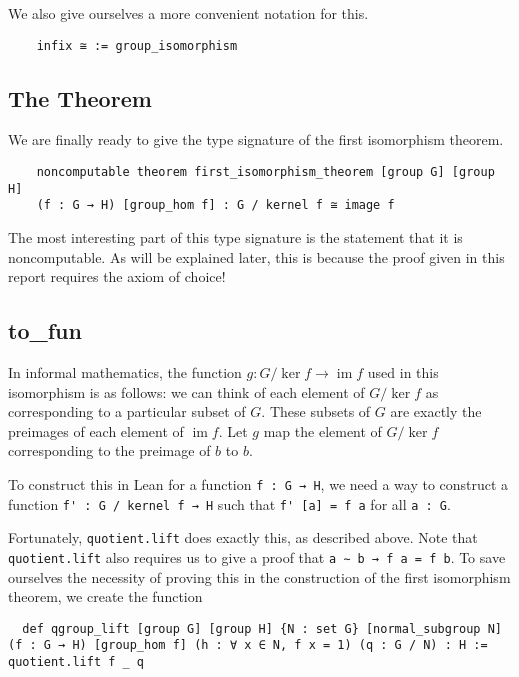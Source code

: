 \documentclass[runningheads,a4paper]{llncs}
\DeclareMathOperator{\im}{im}
\renewcommand{\-}{\setminus}
\begin{document}
We also give ourselves a more convenient notation for this.

\begin{lstlisting}
    infix ≅ := group_isomorphism
\end{lstlisting}

\subsection{The Theorem}

We are finally ready to give the type signature of the first isomorphism theorem.

\begin{lstlisting}
    noncomputable theorem first_isomorphism_theorem [group G] [group H] 
    (f : G → H) [group_hom f] : G / kernel f ≅ image f
\end{lstlisting}

The most interesting part of this type signature is the statement that it is noncomputable. As will be explained later, this is because the proof given in this report requires the axiom of choice!

\subsection{to\_fun}

In informal mathematics, the function $g : G / \ker f \to \im f$ used in this isomorphism is as follows: we can think of each element of $G / \ker f$ as corresponding to a particular subset of $G$. These subsets of $G$ are exactly the preimages of each element of $\im f$. Let $g$ map the element of $G / \ker f$ corresponding to the preimage of $b$ to $b$.

To construct this in Lean for a function \lstinline{f : G → H}, we need a way to construct a function \lstinline{f' : G / kernel f → H} such that \lstinline{f' [a] = f a} for all \lstinline{a : G}.

Fortunately, \lstinline{quotient.lift} does exactly this, as described above. Note that \lstinline{quotient.lift} also requires us to give a proof that \lstinline{a ∼ b → f a = f b}. To save ourselves the necessity of proving this in the construction of the first isomorphism theorem, we create the function

\begin{lstlisting}
  def qgroup_lift [group G] [group H] {N : set G} [normal_subgroup N] (f : G → H) [group_hom f] (h : ∀ x ∈ N, f x = 1) (q : G / N) : H := quotient.lift f _ q
\end{lstlisting}
\end{document}
